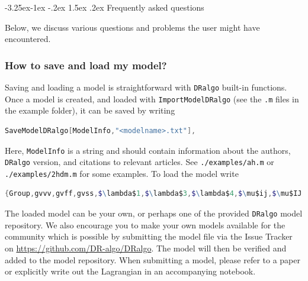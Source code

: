\documentclass[11pt]{article}
\makeatletter
\def\dralgo{{\tt DRalgo}}
\renewcommand\subsection{\@startsection{subsection}{2}{\z@}%
  {-3.25ex\@plus -1ex \@minus -.2ex}%
  {1.5ex \@plus .2ex}%
  {\normalfont\normalsize\bfseries}}
\makeatother
\begin{document}
%
\renewcommand{\thesubsubsection}{Q.\arabic{subsubsection}}
\subsection{Frequently asked questions}
\label{sec:faq}

Below,
we discuss various questions and problems the user might have encountered.

%
\subsubsection{How to save and load my model?}
\label{sec:save}

Saving and loading a model is straightforward with \dralgo{} built-in functions.
Once a model is created, and loaded with {\tt ImportModelDRalgo}
(see the {\tt .m} files in the example folder),
it can be saved by writing
\begin{lstlisting}[language=Mathematica,mathescape=true]
SaveModelDRalgo[ModelInfo,"<modelname>.txt"],
\end{lstlisting}
Here,
{\tt ModelInfo} is a string and should contain information about
the authors,
\dralgo{} version, and
citations to relevant articles.
See
{\tt ./examples/ah.m} or
{\tt ./examples/2hdm.m}
for some examples.
To load the model write
\begin{lstlisting}[language=Mathematica,mathescape=true]
{Group,gvvv,gvff,gvss,$\lambda$1,$\lambda$3,$\lambda$4,$\mu$ij,$\mu$IJ,$\mu$IJC,Ysff,YsffC}=LoadModelDRalgo["<modelname>.txt"];
\end{lstlisting}

The loaded model can be your own, or perhaps one of
the provided \dralgo{} model repository.
We also encourage you to make your own models available for the community
which is possible by submitting the model file
via the Issue Tracker on
\url{https://github.com/DR-algo/DRalgo}. 
The model will then be verified and added to the model repository.
When submitting a model,
please refer to a paper or explicitly write out
the Lagrangian in an accompanying notebook.

%
\end{document}
